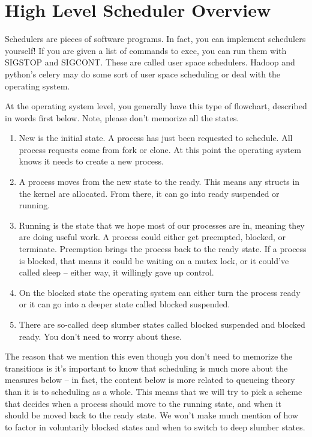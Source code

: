 \section{High Level Scheduler Overview}

Schedulers are pieces of software programs. In fact, you can implement schedulers yourself!
If you are given a list of commands to exec, you can run them with SIGSTOP and SIGCONT.
These are called user space schedulers.
Hadoop and python's celery may do some sort of user space scheduling or deal with the operating system.

At the operating system level, you generally have this type of flowchart, described in words first below.
Note, please don't memorize all the states.

\begin{enumerate}
\item New is the initial state. A process has just been requested to schedule. All process requests come from fork or clone. At this point the operating system knows it needs to create a new process.
\item A process moves from the new state to the ready. This means any structs in the kernel are allocated. From there, it can go into ready suspended or running.
\item Running is the state that we hope most of our processes are in, meaning they are doing useful work. A process could either get preempted, blocked, or terminate. Preemption brings the process back to the ready state. If a process is blocked, that means it could be waiting on a mutex lock, or it could've called sleep -- either way, it willingly gave up control.
\item On the blocked state the operating system can either turn the process ready or it can go into a deeper state called blocked suspended.
\item There are so-called deep slumber states called blocked suspended and blocked ready. You don't need to worry about these.
\end{enumerate}

The reason that we mention this even though you don't need to memorize the transitions is it's important to know that scheduling is much more about the measures below -- in fact, the content below is more related to queueing theory than it is to scheduling as a whole.
This means that we will try to pick a scheme that decides when a process should move to the running state, and when it should be moved back to the ready state.
We won't make much mention of how to factor in voluntarily blocked states and when to switch to deep slumber states.

